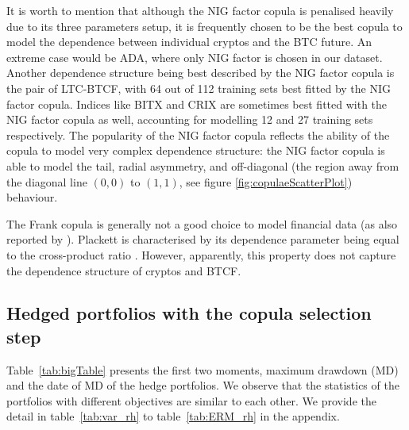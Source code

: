 It is worth to mention that although the NIG factor copula is penalised heavily due to its three parameters setup,
it is frequently chosen to be the best copula to model the dependence
between individual cryptos and the BTC future.
An extreme case would be ADA, where only NIG factor is chosen in our dataset.
Another dependence structure being best described by the NIG factor
copula is the pair of LTC-BTCF, with
64 out of 112 training sets best fitted by the NIG factor copula.
Indices like BITX and CRIX are sometimes best fitted with the NIG
factor copula as well, accounting for modelling 12 and 27 training
sets respectively.
The popularity of the NIG factor copula reflects the ability of the copula to
model very complex dependence structure: the
NIG factor copula is able to model the tail, radial asymmetry, and
off-diagonal (the region away from the diagonal line $(0,0)$ to
$(1,1)$, see figure \ref{fig:copulaeScatterPlot}) behaviour. 
  


The Frank copula is generally not a good choice to model financial
data (as also reported by \cite{barbi2014copula}).
Plackett is characterised by its dependence parameter being equal to
the cross-product ratio %
. 
However, apparently, this property does not capture the dependence
structure of cryptos and BTCF.


\subsection{Hedged portfolios with the copula selection step}\label{subsec:HP2}
%    
\begin{landscape}
  
  \end{landscape}
Table~\ref{tab:bigTable} presents the first two moments, maximum drawdown (MD) and the date of MD of the hedge portfolios.
We observe that the statistics of the portfolios with different objectives are similar to each other.
We provide the detail in table~\ref{tab:var_rh} to table~\ref{tab:ERM_rh} in the appendix. \medskip

